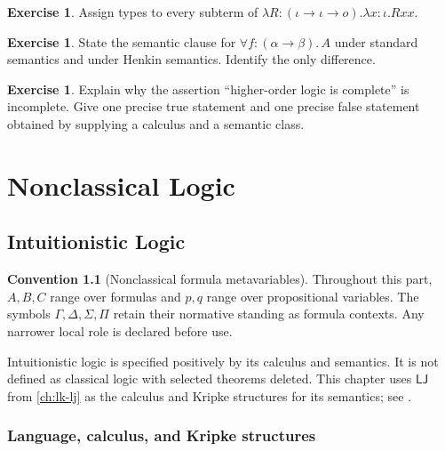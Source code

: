 \documentclass[11pt,oneside,openany]{book}
\theoremstyle{definition}
\newtheorem{exercise}[definition]{Exercise}
\newtheorem{convention}[definition]{Convention}
\theoremstyle{plain}
\theoremstyle{remark}
\newcommand{\LJ}{\mathsf{LJ}}
\begin{document}
\begin{exercise}
\label{ex:simple-type-theory-01}
Assign types to every subterm of
\(\lambda R{:}(\iota\to\iota\to o).\lambda x{:}\iota.Rxx\).
\end{exercise}

\begin{exercise}
\label{ex:simple-type-theory-02}
State the semantic clause for \(\forall f{:}(\alpha\to\beta).\,A\) under
standard semantics and under Henkin semantics.  Identify the only difference.
\end{exercise}

\begin{exercise}
\label{ex:simple-type-theory-03}
Explain why the assertion ``higher-order logic is complete'' is incomplete.
Give one precise true statement and one precise false statement obtained by
supplying a calculus and a semantic class.
\end{exercise}

\part{Nonclassical Logic}
\label{part:nonclassical}

\chapter{Intuitionistic Logic}
\label{ch:intuitionistic-logic}

\begin{convention}[Nonclassical formula metavariables]
Throughout this part, \(A,B,C\) range over formulas and \(p,q\) range over
propositional variables.  The symbols \(\Gamma,\Delta,\Sigma,\Pi\) retain their
normative standing as formula contexts.  Any narrower local role is declared
before use.
\end{convention}

Intuitionistic logic is specified positively by its calculus and semantics.  It
is not defined as classical logic with selected theorems deleted.  This chapter
uses \(\LJ\) from \cref{ch:lk-lj} as the calculus and Kripke
structures for its semantics; see
\cite{Kripke1965,TroelstraSchwichtenberg2000}.

\section{Language, calculus, and Kripke structures}
\label{sec:intuitionistic-logic-01}
\end{document}
